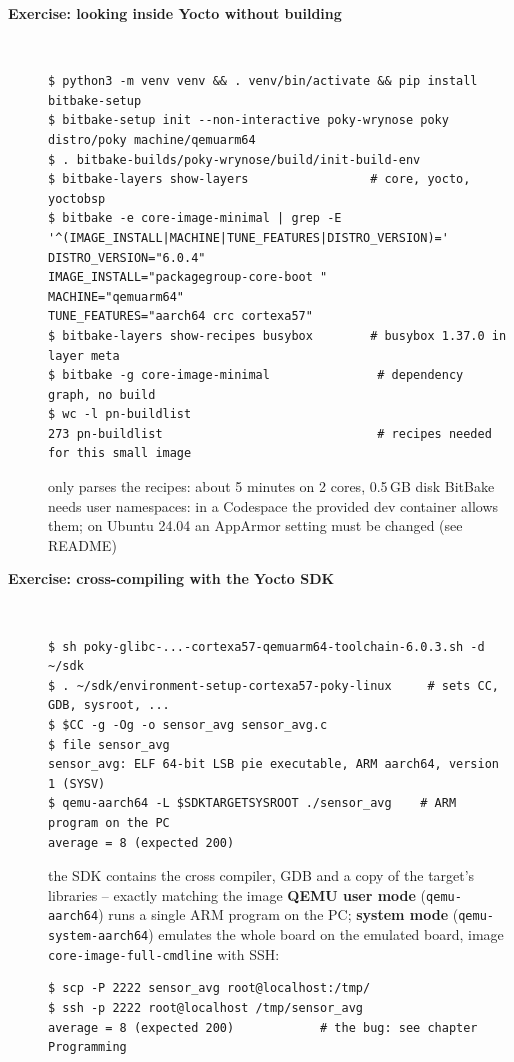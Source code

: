 \begin{description}
\item[{\rot\bf Exercise: looking inside Yocto without building}]~\\
\begin{lstlisting}[language={}]
$ python3 -m venv venv && . venv/bin/activate && pip install bitbake-setup
$ bitbake-setup init --non-interactive poky-wrynose poky distro/poky machine/qemuarm64
$ . bitbake-builds/poky-wrynose/build/init-build-env
$ bitbake-layers show-layers                 # core, yocto, yoctobsp
$ bitbake -e core-image-minimal | grep -E '^(IMAGE_INSTALL|MACHINE|TUNE_FEATURES|DISTRO_VERSION)='
DISTRO_VERSION="6.0.4"
IMAGE_INSTALL="packagegroup-core-boot "
MACHINE="qemuarm64"
TUNE_FEATURES="aarch64 crc cortexa57"
$ bitbake-layers show-recipes busybox        # busybox 1.37.0 in layer meta
$ bitbake -g core-image-minimal               # dependency graph, no build
$ wc -l pn-buildlist
273 pn-buildlist                              # recipes needed for this small image
\end{lstlisting}
\bi
	\ite only parses the recipes: about 5 minutes on 2 cores, 0.5\,GB disk
	\ite BitBake needs user namespaces: in a Codespace the provided dev container allows them; on Ubuntu 24.04 an AppArmor setting must be changed (see README)
\ei
\os{\newpage}

\item[{\rot\bf Exercise: cross-compiling with the Yocto SDK}]~\\
\begin{lstlisting}[language={}]
$ sh poky-glibc-...-cortexa57-qemuarm64-toolchain-6.0.3.sh -d ~/sdk
$ . ~/sdk/environment-setup-cortexa57-poky-linux     # sets CC, GDB, sysroot, ...
$ $CC -g -Og -o sensor_avg sensor_avg.c
$ file sensor_avg
sensor_avg: ELF 64-bit LSB pie executable, ARM aarch64, version 1 (SYSV)
$ qemu-aarch64 -L $SDKTARGETSYSROOT ./sensor_avg    # ARM program on the PC
average = 8 (expected 200)
\end{lstlisting}
\bi
	\ite the SDK contains the cross compiler, GDB and a copy of the target's libraries -- exactly matching the image
	\ite \textbf{QEMU user mode} (\texttt{qemu-aarch64}) runs a single ARM program on the PC; \textbf{system mode} (\texttt{qemu-system-aarch64}) emulates the whole board
	\ite on the emulated board, image \texttt{core-image-full-cmdline} with SSH:
\ei
\begin{lstlisting}[language={}]
$ scp -P 2222 sensor_avg root@localhost:/tmp/
$ ssh -p 2222 root@localhost /tmp/sensor_avg
average = 8 (expected 200)            # the bug: see chapter Programming
\end{lstlisting}
\os{\newpage}


\end{description}

